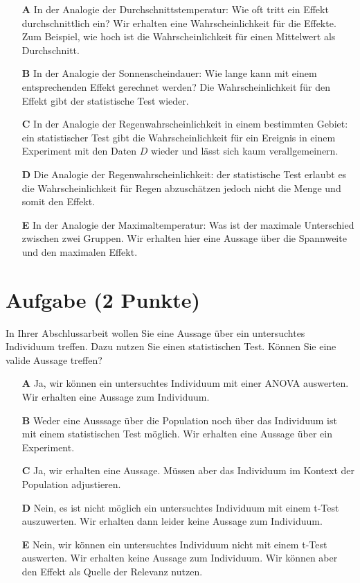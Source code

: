 \documentclass[a4paper, 9pt]{scrartcl}\usepackage[]{graphicx}\usepackage[]{xcolor}
\begin{document}
\begin{enumerate}
\item [\textbf{A} \msquare] In der Analogie der Durchschnittstemperatur: Wie oft tritt ein Effekt durchschnittlich ein? Wir erhalten eine Wahrscheinlichkeit für die Effekte. Zum Beispiel, wie hoch ist die Wahrscheinlichkeit für einen Mittelwert als Durchschnitt.
\item [\textbf{B} \msquare] In der Analogie der Sonnenscheindauer: Wie lange kann mit einem entsprechenden Effekt gerechnet werden? Die Wahrscheinlichkeit für den Effekt gibt der statistische Test wieder.
\item [\textbf{C} \msquare] In der Analogie der Regenwahrscheinlichkeit in einem bestimmten Gebiet: ein statistischer Test gibt die Wahrscheinlichkeit für ein Ereignis in einem Experiment mit den Daten $D$ wieder und lässt sich kaum verallgemeinern.
\item [\textbf{D} \msquare] Die Analogie der Regenwahrscheinlichkeit: der statistische Test erlaubt es die Wahrscheinlichkeit für Regen abzuschätzen jedoch nicht die Menge und somit den Effekt.
\item [\textbf{E} \msquare] In der Analogie der Maximaltemperatur: Was ist der maximale Unterschied zwischen zwei Gruppen. Wir erhalten hier eine Aussage über die Spannweite und den maximalen Effekt.
\end{enumerate}

\section{Aufgabe \hfill (2 Punkte)}



In Ihrer Abschlussarbeit wollen Sie eine Aussage über ein untersuchtes Individuum treffen. Dazu nutzen Sie einen statistischen Test. Können Sie eine valide Aussage treffen?



\begin{enumerate}
\item [\textbf{A} \msquare] Ja, wir können ein untersuchtes Individuum mit einer ANOVA auswerten. Wir erhalten eine Aussage zum Individuum.
\item [\textbf{B} \msquare] Weder eine Ausssage über die Population noch über das Individuum ist mit einem statistischen Test möglich. Wir erhalten eine Aussage über ein Experiment.
\item [\textbf{C} \msquare] Ja, wir erhalten eine Aussage. Müssen aber das Individuum im Kontext der Population adjustieren.
\item [\textbf{D} \msquare] Nein, es ist nicht möglich ein untersuchtes Individuum mit einem t-Test auszuwerten. Wir erhalten dann leider keine Aussage zum Individuum.
\item [\textbf{E} \msquare] Nein, wir können ein untersuchtes Individuum nicht mit einem t-Test auswerten. Wir erhalten keine Aussage zum Individuum. Wir können aber den Effekt als Quelle der Relevanz nutzen.
\end{enumerate}
\end{document}
